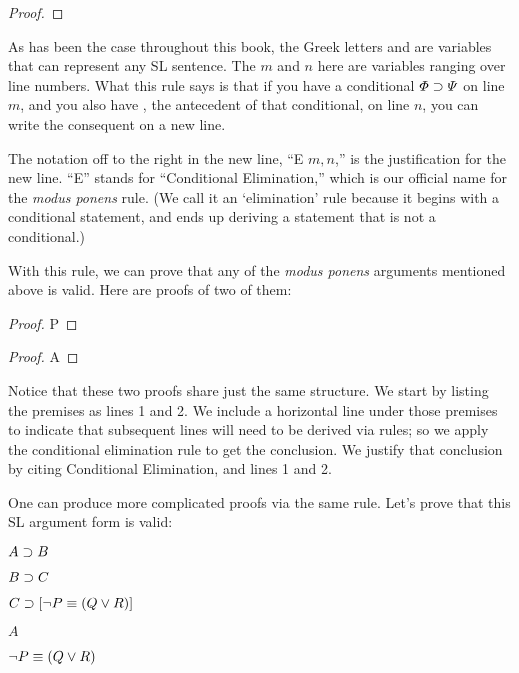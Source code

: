 \begin{proof}
	\metaA{}
	\metaB{} 
\end{proof}

As has been the case throughout this book, the Greek letters \metaA{} and \metaB{} are variables that can represent any SL sentence. The $m$ and $n$ here are variables ranging over line numbers. What this rule says is that if you have a conditional $\varPhi{}\supset\varPsi{}$ on line $m$, and you also have \metaA{}, the antecedent of that conditional, on line $n$, you can write the consequent \metaB{} on a new line.

The notation off to the right in the new line, ``\eif E $m, n$,'' is the justification for the new line. ``\eif E'' stands for ``Conditional Elimination,'' which is our official name for the \emph{modus ponens} rule. (We call it an `elimination' rule because it begins with a conditional statement, and ends up deriving a statement that is not a conditional.)

With this rule, we can prove that any of the \emph{modus ponens} arguments mentioned above is valid. Here are proofs of two of them:


\begin{multicols}{2}

\begin{proof}
	P
	 
\end{proof}


\begin{proof}
	A 
\end{proof}

\end{multicols}

Notice that these two proofs share just the same structure. We start by listing the premises as lines 1 and 2. We include a horizontal line under those premises to indicate that subsequent lines will need to be derived via rules; so we apply the conditional elimination rule to get the conclusion. We justify that conclusion by citing Conditional Elimination, and lines 1 and 2.

One can produce more complicated proofs via the same rule. Let's prove that this SL argument form is valid:

\begin{earg}

\item[] $A \supset B$
\item[] $B \supset C$
\item[] $C \supset [\neg P \equiv (Q \vee R)]$
\item[] $A$
\item[\therefore] $\neg P \equiv (Q \vee R)$
\end{earg}

